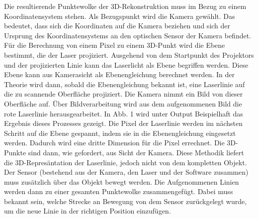 	Die resultierende Punktewolke der 3D-Rekonstruktion muss im Bezug zu einem Koordinatensystem stehen. Als Bezugspunkt wird die Kamera gewählt. Das bedeutet, dass sich die Koordinaten auf die Kamera beziehen und sich der Ursprung des Koordinatensystems an den optischen Sensor der Kamera befindet. Für die Berechnung von einem Pixel zu einem 3D-Punkt wird die Ebene bestimmt, die der Laser projiziert. Ausgehend von dem Startpunkt des Projektors und der projizierten Linie kann das Laserlicht als Ebene begriffen werden. Diese Ebene kann aus Kamerasicht als Ebenengleichung berechnet werden. In der Theorie wird dann, sobald die Ebenengleichung bekannt ist, eine Laserlinie auf die zu scannende Oberfläche projiziert. Die Kamera nimmt ein Bild von dieser Oberfläche auf. Über Bildverarbeitung wird aus dem aufgenommenen Bild die rote Laserlinie herausgearbeitet. In Abb. 1 wird unter Output Beispielhaft das Ergebnis dieses Prozesses gezeigt. Die Pixel der Laserlinie werden im nächsten Schritt auf die Ebene gespannt, indem sie in die Ebenengleichung eingesetzt werden. Dadurch wird eine dritte Dimension für die Pixel errechnet. Die 3D-Punkte sind dann, wie gefordert, aus Sicht der Kamera. Diese Methodik liefert die 3D-Represäntation der Laserlinie, jedoch nicht von dem kompletten Objekt. Der Sensor (bestehend aus der Kamera, den Laser und der Software zusammen) muss zusätzlich über das Objekt bewegt werden. Die Aufgenommenen Linien werden dann zu einer gesamten Punktewolke zusammengefügt. Dabei muss bekannt sein, welche Strecke an Bewegung von dem Sensor zurückgelegt wurde, um die neue Linie in der richtigen Position einzufügen. 
